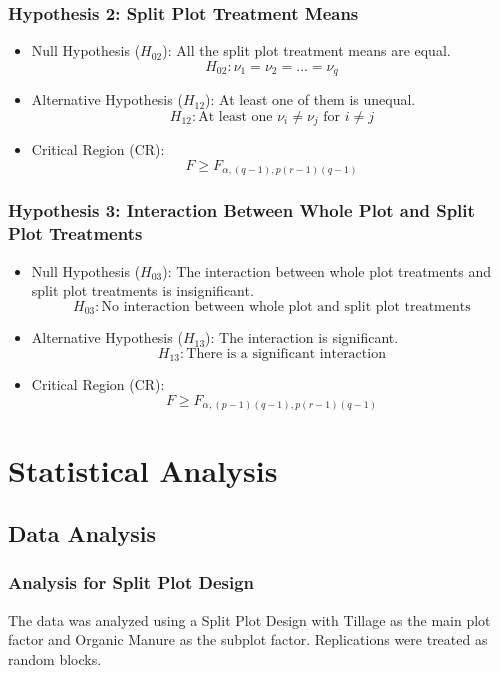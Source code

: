 \documentclass[oneside,12pt,fleqn]{book}
\begin{document}
\subsection*{Hypothesis 2: Split Plot Treatment Means}
\begin{itemize}
    \item Null Hypothesis ($H_{02}$): All the split plot treatment means are equal.  
    \[
    H_{02}: \nu_1 = \nu_2 = \dots = \nu_q
    \]
    \item Alternative Hypothesis ($H_{12}$): At least one of them is unequal.  
    \[
    H_{12}: \text{At least one } \nu_i \neq \nu_j \text{ for } i \neq j
    \]
    \item Critical Region (CR): 
    \[
    F \geq F_{\alpha, (q-1), p(r-1)(q-1)}
    \]
\end{itemize}

\subsection*{Hypothesis 3: Interaction Between Whole Plot and Split Plot Treatments}
\begin{itemize}
    \item Null Hypothesis ($H_{03}$): The interaction between whole plot treatments and split plot treatments is insignificant.  
    \[
    H_{03}: \text{No interaction between whole plot and split plot treatments}
    \]
    \item Alternative Hypothesis ($H_{13}$): The interaction is significant.  
    \[
    H_{13}: \text{There is a significant interaction}
    \]
    \item Critical Region (CR): 
    \[
    F \geq F_{\alpha, (p-1)(q-1), p(r-1)(q-1)}
    \]
\end{itemize}

\chapter{Statistical Analysis}


\section{Data Analysis}

\subsection{Analysis for Split Plot Design}
The data was analyzed using a Split Plot Design with Tillage as the main plot factor and Organic Manure as the subplot factor. Replications were treated as random blocks.
\end{document}
